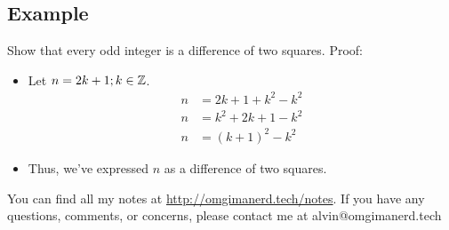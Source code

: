 \documentclass{math}
\begin{document}
\subsection*{Example}
Show that every odd integer is a difference of two squares. Proof:
\begin{itemize}
  \item Let \( n = 2k+1; k\in\mathbb{Z} \).
    \begin{align*}
      n &= 2k+1+k^{2}-k^{2} \\
      n &= k^{2}+2k+1-k^{2} \\
      n &= (k+1)^{2}-k^{2}
    \end{align*}
  \item Thus, we've expressed \( n \) as a difference of two squares.
\end{itemize}

\begin{center}
  You can find all my notes at \url{http://omgimanerd.tech/notes}. If you have
  any questions, comments, or concerns, please contact me at
  alvin@omgimanerd.tech
\end{center}
\end{document}
